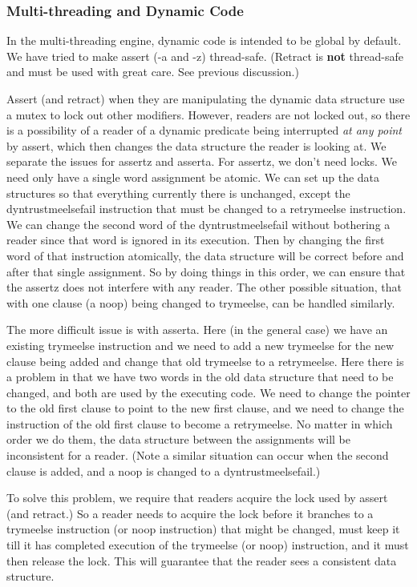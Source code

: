 \documentclass[11pt]{article}
\begin{document}
\subsubsection{Multi-threading and Dynamic Code}
In the multi-threading engine, dynamic code is intended to be global
by default.  We have tried to make assert (-a and -z) thread-safe.
(Retract is {\bf not} thread-safe and must be used with great care.
See previous discussion.)

Assert (and retract) when they are manipulating the dynamic data
structure use a mutex to lock out other modifiers.  However, readers
are not locked out, so there is a possibility of a reader of a dynamic
predicate being interrupted {\em at any point} by assert, which then
changes the data structure the reader is looking at.  We separate the
issues for assertz and asserta.  For assertz, we don't need locks.  We
need only have a single word assignment be atomic.  We can set up the
data structures so that everything currently there is unchanged,
except the dyntrustmeelsefail instruction that must be changed to a
retrymeelse instruction.  We can change the second word of the
dyntrustmeelsefail without bothering a reader since that word is
ignored in its execution.  Then by changing the first word of that
instruction atomically, the data structure will be correct before and
after that single assignment.  So by doing things in this order, we
can ensure that the assertz does not interfere with any reader.  The
other possible situation, that with one clause (a noop) being changed
to trymeelse, can be handled similarly.

The more difficult issue is with asserta.  Here (in the general case)
we have an existing trymeelse instruction and we need to add a new
trymeelse for the new clause being added and change that old trymeelse
to a retrymeelse.  Here there is a problem in that we have two words
in the old data structure that need to be changed, and both are used
by the executing code.  We need to change the pointer to the old first
clause to point to the new first clause, and we need to change the
instruction of the old first clause to become a retrymeelse.  No
matter in which order we do them, the data structure between the
assignments will be inconsistent for a reader.  (Note a similar
situation can occur when the second clause is added, and a noop is
changed to a dyntrustmeelsefail.)

To solve this problem, we require that readers acquire the lock used
by assert (and retract.)  So a reader needs to acquire the lock before
it branches to a trymeelse instruction (or noop instruction) that
might be changed, must keep it till it has completed execution of the
trymeelse (or noop) instruction, and it must then release the lock.
This will guarantee that the reader sees a consistent data structure.
\end{document}
